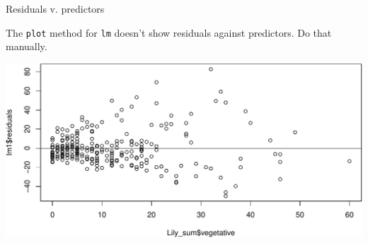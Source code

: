 \documentclass[
  ignorenonframetext,
]{beamer}
\newenvironment{Shaded}{\begin{snugshade}}{\end{snugshade}}
\newcommand{\DataTypeTok}[1]{\textcolor[rgb]{0.13,0.29,0.53}{#1}}
\newcommand{\DecValTok}[1]{\textcolor[rgb]{0.00,0.00,0.81}{#1}}
\newcommand{\KeywordTok}[1]{\textcolor[rgb]{0.13,0.29,0.53}{\textbf{#1}}}
\newcommand{\NormalTok}[1]{#1}
\newcommand{\OperatorTok}[1]{\textcolor[rgb]{0.81,0.36,0.00}{\textbf{#1}}}
\begin{document}
\begin{frame}[fragile]{Residuals v. predictors}
\protect\hypertarget{residuals-v.-predictors}{}

The \texttt{plot} method for \texttt{lm} doesn't show residuals against
predictors. Do that manually.

\scriptsize

\begin{Shaded}
\end{Shaded}

\includegraphics{data_viz_files/figure-beamer/unnamed-chunk-14-1.pdf}

\end{frame}
\end{document}
